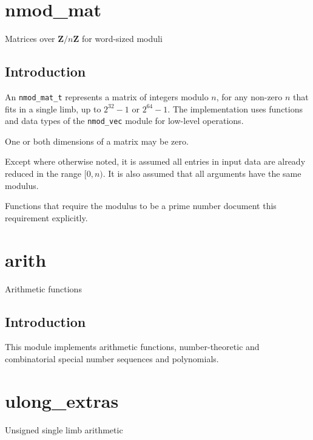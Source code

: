 \documentclass[a4paper,10pt]{book}
\newcommand{\Z}{\mathbf{Z}}%
\newcommand{\code}{\lstinline}
\begin{document}
\chapter{nmod\_mat}
\epigraph{Matrices over $\Z / n \Z$ for word-sized moduli}{}

\section{Introduction}

An \code{nmod_mat_t} represents a matrix of integers modulo $n$, for any 
non-zero $n$ that fits in a single limb, up to $2^{32}-1$ or $2^{64}-1$. The
implementation uses functions and data types of the \code{nmod_vec} module
for low-level operations.

One or both dimensions of a matrix may be zero.

Except where otherwise noted, it is assumed all entries in input
data are already reduced in the range $[0, n)$. It is also assumed that
all arguments have the same modulus.

Functions that require the modulus to be a prime number document this
requirement explicitly.




\chapter{arith}
\epigraph{Arithmetic functions}{}

\section{Introduction}

This module implements arithmetic functions, number-theoretic and 
combinatorial special number sequences and polynomials.




\chapter{ulong\_extras}
\epigraph{Unsigned single limb arithmetic}{}
\end{document}
